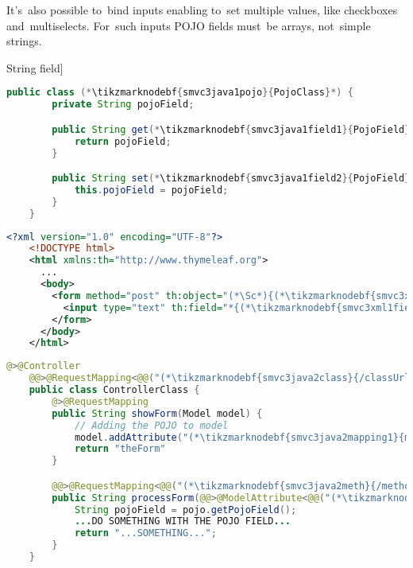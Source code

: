 It's~also possible to~bind inputs enabling to~set multiple values, like checkboxes and~multiselects.
For~such inputs POJO fields must~be arrays, not~simple strings.
\newpage

\examplenonl[binding text input to \hyperref[pojo]{POJO} String field]
\enlargethispage{20mm}
\thispagestyle{empty}
\begin{lstlisting}[language=Java, title={POJO class with one String field}]
    public class (*\tikzmarknodebf{smvc3java1pojo}{PojoClass}*) {
        private String pojoField;

        public String get(*\tikzmarknodebf{smvc3java1field1}{PojoField}*)() {
            return pojoField;
        }

        public String set(*\tikzmarknodebf{smvc3java1field2}{PojoField}*)(String pojoField) {
            this.pojoField = pojoField;
        }
    }
\end{lstlisting}
\begin{lstlisting}[language=XML, title={HTML form setting the field}]
    <?xml version="1.0" encoding="UTF-8"?>
    <!DOCTYPE html>
    <html xmlns:th="http://www.thymeleaf.org">
      ...
      <body>
        <form method="post" th:object="(*\Sc*){(*\tikzmarknodebf{smvc3xml1mapping}{mappingId}[ForestGreen]*)}" th:action="@{(*\tikzmarknodebf{smvc3xml1class}{/classUrl}[ForestGreen]\tikzmarknodebf{smvc3xml1meth}{/methodUrl}[ForestGreen]*)}">
          <input type="text" th:field="*{(*\tikzmarknodebf{smvc3xml1field}{pojoField}[ForestGreen]*)}">
        </form>
      </body>
    </html>
\end{lstlisting}
\begin{lstlisting}[language=Java, title={Controller displaying and processing the form}]
    @>@Controller
    @@>@RequestMapping<@@("(*\tikzmarknodebf{smvc3java2class}{/classUrl}[ForestGreen]*)")
    public class ControllerClass {
        @>@RequestMapping
        public String showForm(Model model) {
            // Adding the POJO to model
            model.addAttribute("(*\tikzmarknodebf{smvc3java2mapping1}{mappingId}[ForestGreen]*)", new (*\tikzmarknodebf{smvc3java2pojo1}{PojoClass}*)())
            return "theForm"
        }

        @@>@RequestMapping<@@("(*\tikzmarknodebf{smvc3java2meth}{/methodUrl}[ForestGreen]*)")
        public String processForm(@@>@ModelAttribute<@@("(*\tikzmarknodebf{smvc3java2mapping2}{mappingId}[ForestGreen]*)") (*\tikzmarknodebf{smvc3java2pojo2}{PojoClass}*) pojo) {
            String pojoField = pojo.getPojoField();
            ...DO SOMETHING WITH THE POJO FIELD...
            return "...SOMETHING...";
        }
    }
\end{lstlisting}
